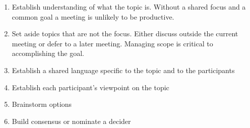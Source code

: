 \begin{enumerate}
    \item Establish understanding of what the topic is. Without a shared focus and a common goal a meeting is unlikely to be productive. 
    \item Set aside topics that are not the focus. Either discuss outside the current meeting or defer to a later meeting. Managing scope is critical to accomplishing the goal. 
    \item Establish a shared language specific to the topic and to the participants
    \item Establish each participant's viewpoint on the topic
    \item Brainstorm options
    \item Build consensus or nominate a decider
\end{enumerate}